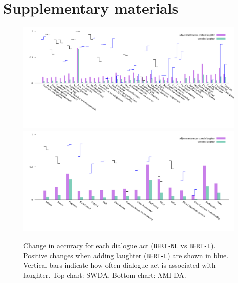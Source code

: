 \documentclass[11pt,a4paper]{article}
\begin{document}




\appendix
\onecolumn
\section{Supplementary materials}\label{sec:suppl}

\begin{figure}[h!]
  \centering
  \includegraphics[width=\linewidth]{img/SWDA-bertLvsNL.pdf}
  \includegraphics[width=\linewidth]{img/AMI-DA-bertLvsNL.pdf}
  \caption{Change in accuracy for each dialogue act (\texttt{BERT-NL} vs \texttt{BERT-L}). Positive changes when adding laughter (\texttt{BERT-L}) are shown in blue. Vertical bars indicate how often dialogue act is associated with laughter. Top chart: SWDA, Bottom chart: AMI-DA. }
    \label{fig:by-da}
  \end{figure}
\end{document}
